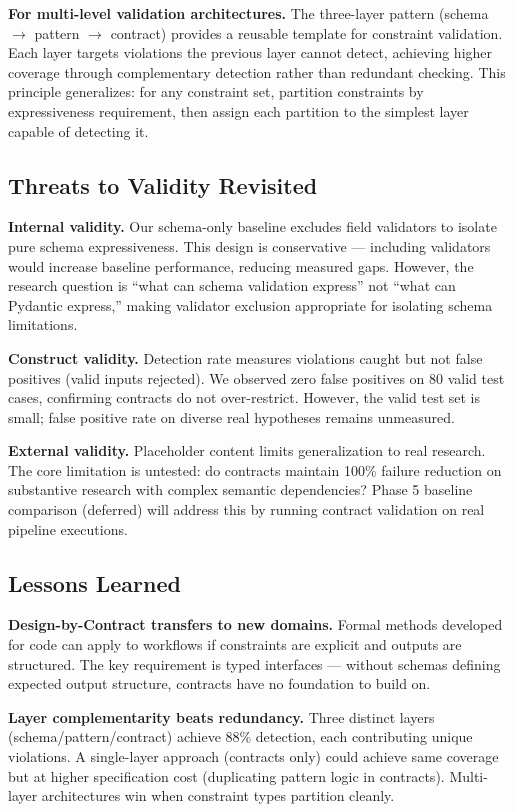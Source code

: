 \textbf{For multi-level validation architectures.} The three-layer pattern (schema $\rightarrow$ pattern $\rightarrow$ contract) provides a reusable template for constraint validation. Each layer targets violations the previous layer cannot detect, achieving higher coverage through complementary detection rather than redundant checking. This principle generalizes: for any constraint set, partition constraints by expressiveness requirement, then assign each partition to the simplest layer capable of detecting it.

\subsection{Threats to Validity Revisited}

\textbf{Internal validity.} Our schema-only baseline excludes field validators to isolate pure schema expressiveness. This design is conservative --- including validators would increase baseline performance, reducing measured gaps. However, the research question is ``what can schema validation express'' not ``what can Pydantic express,'' making validator exclusion appropriate for isolating schema limitations.

\textbf{Construct validity.} Detection rate measures violations caught but not false positives (valid inputs rejected). We observed zero false positives on 80 valid test cases, confirming contracts do not over-restrict. However, the valid test set is small; false positive rate on diverse real hypotheses remains unmeasured.

\textbf{External validity.} Placeholder content limits generalization to real research. The core limitation is untested: do contracts maintain 100\% failure reduction on substantive research with complex semantic dependencies? Phase 5 baseline comparison (deferred) will address this by running contract validation on real pipeline executions.

\subsection{Lessons Learned}

\textbf{Design-by-Contract transfers to new domains.} Formal methods developed for code can apply to workflows if constraints are explicit and outputs are structured. The key requirement is typed interfaces --- without schemas defining expected output structure, contracts have no foundation to build on.

\textbf{Layer complementarity beats redundancy.} Three distinct layers (schema/pattern/contract) achieve 88\% detection, each contributing unique violations. A single-layer approach (contracts only) could achieve same coverage but at higher specification cost (duplicating pattern logic in contracts). Multi-layer architectures win when constraint types partition cleanly.

